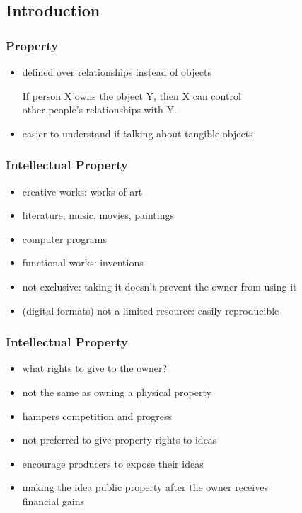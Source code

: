 \documentclass[dvipsnames]{beamer}
\theoremstyle{definition}
\theoremstyle{example}
\theoremstyle{plain}
\begin{document}
\subsection{Introduction}

\begin{frame}
  \frametitle{Property}

  \begin{itemize}
    \item defined over relationships instead of objects

    \medskip
    If person X owns the object Y, then X can control\\
    other people's relationships with Y.

    \medskip
    \item easier to understand if talking about tangible objects
  \end{itemize}
\end{frame}

\begin{frame}
  \frametitle{Intellectual Property}

  \begin{itemize}
    \item creative works: works of art
    \item literature, music, movies, paintings
    \item computer programs

    \medskip
    \item functional works: inventions
  \end{itemize}

  \pause
  \bigskip
  \begin{itemize}
    \item not exclusive: taking it doesn't prevent the owner from using it

    \medskip
    \item (digital formats) not a limited resource: easily reproducible
  \end{itemize}
\end{frame}

\begin{frame}
  \frametitle{Intellectual Property}

  \begin{itemize}
    \item what rights to give to the owner?
    \smallskip
    \item not the same as owning a physical property
    \item hampers competition and progress

    \pause
    \bigskip
    \item not preferred to give property rights to ideas
    \smallskip
    \item encourage producers to expose their ideas
    \item making the idea public property after the owner receives\\
      financial gains
  \end{itemize}
\end{frame}
\end{document}
